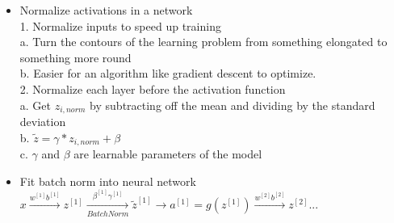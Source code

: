 \begin{itemize}
    \begin{itemize}
        \item Normalize activations in a network\\
1. Normalize inputs to speed up training\\
\tab a. Turn the contours of the learning problem from something elongated to something more round\\
\tab b. Easier for an algorithm like gradient descent to optimize. \\
2. Normalize each layer before the activation function \\
\tab a.  Get $z_{i,norm}$ by subtracting off the mean and dividing by the standard deviation\\ 
\tab b. $\widetilde{z} = \gamma * z_{i,norm} + \beta$\\ 
\tab c. $\gamma$ and $\beta$ are learnable parameters of the model
        \item Fit batch norm into neural network\\
$x \xrightarrow{w^{[1]} b^{[1]}}z^{[1]} \xrightarrow[Batch Norm]{\beta^{[1]} \gamma^{[1]}}\widetilde{z}^{[1]}\xrightarrow{}a^{[1]}=g(z^{[1]})\xrightarrow{w^{[2]} b^{[2]}}z^{[2]}$...\\


\end{itemize}
\end{itemize}
